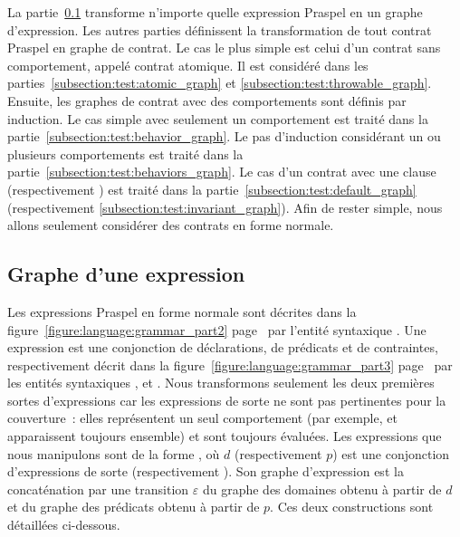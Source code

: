 La partie~\ref{subsection:test:expression_graph} transforme n'importe quelle
expression Praspel en un graphe d'expression. Les autres parties définissent la
transformation de tout contrat Praspel en graphe de contrat. Le cas le plus
simple est celui d'un contrat sans comportement, appelé {\strong contrat
atomique}. Il est considéré dans les parties~\ref{subsection:test:atomic_graph}
et \ref{subsection:test:throwable_graph}. Ensuite, les graphes de contrat avec
des comportements sont définis par induction. Le cas simple avec seulement un
comportement est traité dans la partie~\ref{subsection:test:behavior_graph}. Le
pas d'induction considérant un ou plusieurs comportements est traité dans la
partie~\ref{subsection:test:behaviors_graph}. Le cas d'un contrat avec une
clause \adefault (respectivement \ainvariant) est traité dans la
partie~\ref{subsection:test:default_graph} (respectivement
\ref{subsection:test:invariant_graph}). Afin de rester simple, nous allons
seulement considérer des contrats en forme normale.

\subsection{Graphe d'une expression}
\label{subsection:test:expression_graph}

Les expressions Praspel en forme normale sont décrites dans la
figure~\ref{figure:language:grammar_part2}
page~\pageref{figure:language:grammar_part2} par l'entité syntaxique
. Une expression est une conjonction de déclarations, de
prédicats et de contraintes, respectivement décrit dans la
figure~\ref{figure:language:grammar_part3}
page~\pageref{figure:language:grammar_part3} par les entités syntaxiques
,  et . Nous transformons
seulement les deux premières sortes d'expressions car les expressions de sorte
 ne sont pas pertinentes pour la couverture~: elles
représentent un seul comportement (par exemple,  et
 apparaissent toujours ensemble) et sont toujours évaluées.
Les expressions que nous manipulons sont de la forme , où $d$ (respectivement $p$) est une conjonction d'expressions de sorte
 (respectivement ). Son graphe d'expression
est la concaténation par une transition $\varepsilon$ du {\strong graphe des
domaines} obtenu à partir de $d$ et du {\strong graphe des prédicats} obtenu à
partir de $p$. Ces deux constructions sont détaillées ci-dessous.

